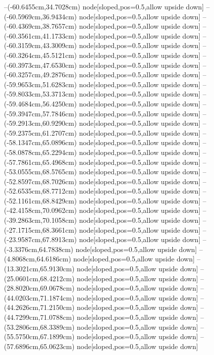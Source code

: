 --(-60.6455cm,34.7028cm) node[sloped,pos=0.5,allow upside down]{\ArrowIn}
--(-60.5969cm,36.9434cm) node[sloped,pos=0.5,allow upside down]{\ArrowIn}
--(-60.4369cm,38.7657cm) node[sloped,pos=0.5,allow upside down]{\ArrowIn}
--(-60.3561cm,41.1733cm) node[sloped,pos=0.5,allow upside down]{\ArrowIn}
--(-60.3159cm,43.3009cm) node[sloped,pos=0.5,allow upside down]{\ArrowIn}
--(-60.3264cm,45.5121cm) node[sloped,pos=0.5,allow upside down]{\ArrowIn}
--(-60.3973cm,47.6530cm) node[sloped,pos=0.5,allow upside down]{\ArrowIn}
--(-60.3257cm,49.2876cm) node[sloped,pos=0.5,allow upside down]{\ArrowIn}
--(-59.9653cm,51.6283cm) node[sloped,pos=0.5,allow upside down]{\ArrowIn}
--(-59.8033cm,53.3713cm) node[sloped,pos=0.5,allow upside down]{\ArrowIn}
--(-59.4684cm,56.4250cm) node[sloped,pos=0.5,allow upside down]{\ArrowIn}
--(-59.3947cm,57.7846cm) node[sloped,pos=0.5,allow upside down]{\ArrowIn}
--(-59.2913cm,60.9290cm) node[sloped,pos=0.5,allow upside down]{\ArrowIn}
--(-59.2375cm,61.2707cm) node[sloped,pos=0.5,allow upside down]{\arrowIn}
--(-58.1347cm,65.0896cm) node[sloped,pos=0.5,allow upside down]{\ArrowIn}
--(-58.0878cm,65.2294cm) node[sloped,pos=0.5,allow upside down]{\arrowIn}
--(-57.7861cm,65.4968cm) node[sloped,pos=0.5,allow upside down]{\arrowIn}
--(-53.0555cm,68.5765cm) node[sloped,pos=0.5,allow upside down]{\ArrowIn}
--(-52.8597cm,68.7026cm) node[sloped,pos=0.5,allow upside down]{\arrowIn}
--(-52.6535cm,68.7712cm) node[sloped,pos=0.5,allow upside down]{\arrowIn}
--(-52.1161cm,68.8429cm) node[sloped,pos=0.5,allow upside down]{\arrowIn}
--(-42.4158cm,70.0962cm) node[sloped,pos=0.5,allow upside down]{\ArrowIn}
--(-39.2863cm,70.1058cm) node[sloped,pos=0.5,allow upside down]{\ArrowIn}
--(-27.1715cm,68.3661cm) node[sloped,pos=0.5,allow upside down]{\ArrowIn}
--(-23.9587cm,67.8913cm) node[sloped,pos=0.5,allow upside down]{\ArrowIn}
--(-3.3376cm,64.7838cm) node[sloped,pos=0.5,allow upside down]{\ArrowIn}
--(4.8068cm,64.6186cm) node[sloped,pos=0.5,allow upside down]{\ArrowIn}
--(13.3021cm,65.9130cm) node[sloped,pos=0.5,allow upside down]{\ArrowIn}
--(25.0601cm,68.4212cm) node[sloped,pos=0.5,allow upside down]{\ArrowIn}
--(28.8020cm,69.0678cm) node[sloped,pos=0.5,allow upside down]{\ArrowIn}
--(44.0203cm,71.1874cm) node[sloped,pos=0.5,allow upside down]{\ArrowIn}
--(44.2626cm,71.2150cm) node[sloped,pos=0.5,allow upside down]{\arrowIn}
--(44.7299cm,71.0788cm) node[sloped,pos=0.5,allow upside down]{\arrowIn}
--(53.2806cm,68.3389cm) node[sloped,pos=0.5,allow upside down]{\ArrowIn}
--(55.5750cm,67.1899cm) node[sloped,pos=0.5,allow upside down]{\ArrowIn}
--(57.6896cm,65.0623cm) node[sloped,pos=0.5,allow upside down]{\ArrowIn}
